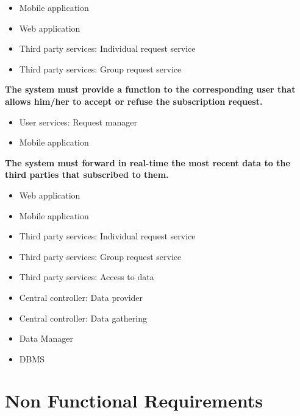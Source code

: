 \begin{enumerate} [label={\bf[R\arabic*]}]
        \begin{itemize}
            \item Mobile application
            \item Web application
            \item Third party services: Individual request service
            \item Third party services: Group request service
        \end{itemize}
    \item \textbf{The system must provide a function to the corresponding user that allows him/her to accept or refuse the subscription request.}
        \begin{itemize}
            \item User services: Request manager
            \item Mobile application
        \end{itemize}
    \item \textbf{The system must forward in real-time the most recent data to the third parties that subscribed to them.}   
        \begin{itemize}
            \item Web application
            \item Mobile application
            \item Third party services: Individual request service
            \item Third party services: Group request service
            \item Third party services: Access to data
            \item Central controller: Data provider
            \item Central controller: Data gathering
            \item Data Manager
            \item DBMS
        \end{itemize}
\end{enumerate}

\section{Non Functional Requirements}